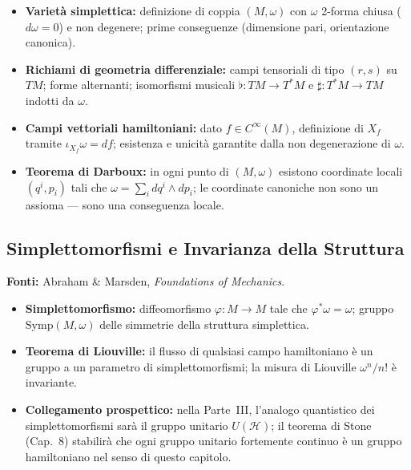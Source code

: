 \documentclass[12pt, a4paper]{article}
\newcommand{\fonti}[1]{%
	\begin{fontebox}
		\textcolor{fontecolor}{\footnotesize\textbf{Fonti:} #1}
	\end{fontebox}%
}
\begin{document}
	\begin{itemize}
		\item \textbf{Varietà simplettica:} definizione di coppia $(M, \omega)$ con $\omega$
		2-forma chiusa ($d\omega = 0$) e non degenere; prime conseguenze (dimensione
		pari, orientazione canonica).
		\item \textbf{Richiami di geometria differenziale:} campi tensoriali di tipo $(r,s)$
		su $TM$; forme alternanti; isomorfismi musicali $\flat: TM \to T^*M$ e
		$\sharp: T^*M \to TM$ indotti da $\omega$.
		\item \textbf{Campi vettoriali hamiltoniani:} dato $f \in C^\infty(M)$, definizione
		di $X_f$ tramite $\iota_{X_f}\omega = df$; esistenza e unicità garantite dalla
		non degenerazione di $\omega$.
		\item \textbf{Teorema di Darboux:} in ogni punto di $(M, \omega)$ esistono
		coordinate locali $(q^i, p_i)$ tali che $\omega = \sum_i dq^i \wedge dp_i$;
		le coordinate canoniche non sono un assioma --- sono una conseguenza locale.
	\end{itemize}
	
	\subsection{Simplettomorfismi e Invarianza della Struttura}
	
	\fonti{Abraham \& Marsden, \textit{Foundations of Mechanics}.}
	
	\begin{itemize}
		\item \textbf{Simplettomorfismo:} diffeomorfismo $\varphi: M \to M$ tale che
		$\varphi^*\omega = \omega$; gruppo $\mathrm{Symp}(M, \omega)$ delle simmetrie
		della struttura simplettica.
		\item \textbf{Teorema di Liouville:} il flusso di qualsiasi campo hamiltoniano
		è un gruppo a un parametro di simplettomorfismi; la misura di Liouville
		$\omega^n/n!$ è invariante.
		\item \textbf{Collegamento prospettico:} nella Parte~III, l'analogo quantistico
		dei simplettomorfismi sarà il gruppo unitario $U(\mathcal{H})$; il teorema di
		Stone (Cap.\ 8) stabilirà che ogni gruppo unitario fortemente continuo è
		un gruppo hamiltoniano nel senso di questo capitolo.
	\end{itemize}
	
	\newpage
\end{document}

